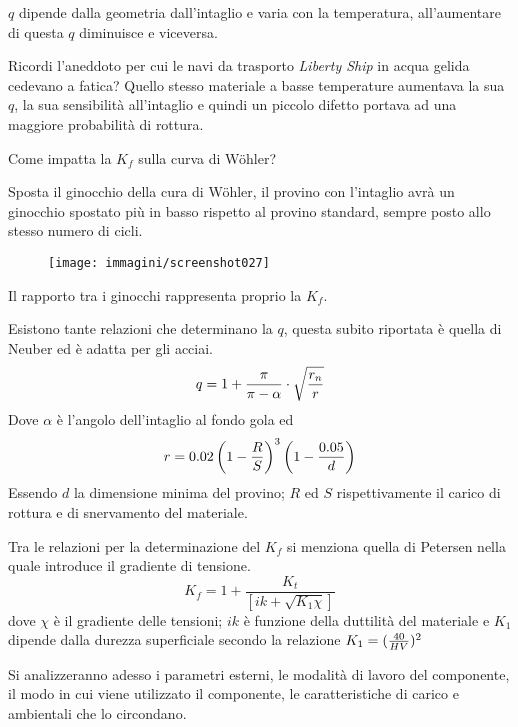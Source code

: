 \documentclass{article}
\begin{document}
\begin{adjustwidth}{2in}{}
			   $ q $ dipende dalla geometria dall'intaglio e varia con la temperatura, all'aumentare di questa $ q $ diminuisce  e viceversa.
			   
			   Ricordi l'aneddoto per cui le navi da trasporto \textit{Liberty Ship} in acqua gelida cedevano a fatica? Quello stesso materiale a basse temperature aumentava la sua $ q $, la sua sensibilità all'intaglio e quindi un piccolo difetto portava ad una maggiore probabilità di rottura. \newline
			   
			 Come impatta la $K_f$ sulla curva di Wöhler?
			 
			 Sposta il ginocchio della cura di Wöhler, il provino con l'intaglio avrà un ginocchio spostato più  in  basso rispetto al provino standard, sempre posto allo stesso numero di cicli. 
			 
			 \begin{figure}[H]
			 	\centering
			 	\texttt{[image: immagini/screenshot027]}
			 	\label{fig:screenshot027}
			 \end{figure}			 
			 
			 Il rapporto tra i ginocchi rappresenta proprio la $K_f$. \newline
			 
			 Esistono tante relazioni che determinano la $ q $, questa subito riportata è quella di Neuber ed è adatta per gli acciai.
			 \[q = 1+\dfrac{\pi}{\pi-\alpha}\cdot\sqrt{r_n\over r}\]
			 Dove $\alpha$ è l’angolo dell’intaglio al fondo gola ed
			 \[r = 0.02\left(1-{R\over S}\right)^3\left(1-{0.05\over d}\right)\]
			 Essendo $ d $ la dimensione minima del provino; $ R $ ed $ S $ rispettivamente il carico di rottura e di snervamento del  materiale.\newline 
			 
			 Tra le relazioni per la determinazione del $K_f$ si menziona quella di Petersen nella quale introduce il gradiente di tensione.
			 \[K_f = 1+ \dfrac{K_t}{\left[ik + \sqrt{K_1\chi}\right]}\]
			 dove $\chi$ è il gradiente delle tensioni; $ ik $ è funzione della duttilità del materiale e
			 $ K_1 $ dipende dalla durezza superficiale secondo la relazione \(K_1 = ({40\over HV})^2\)
			 
			 \vspace{1cm}			   
			 Si analizzeranno adesso i parametri esterni, le modalità di lavoro del componente, il modo in cui viene utilizzato il componente, le caratteristiche di carico e ambientali che lo circondano. \newpage
			 \vspace{1cm}
			 

\end{adjustwidth}
\end{document}
